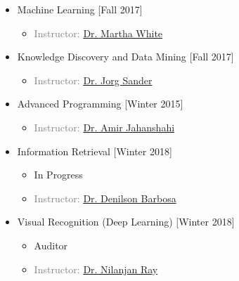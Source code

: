 \begin{multicols}{2}
\begin{itemize}
	\item {} Machine Learning \hfill[Fall 2017]
	\begin{itemize}
		\item \textcolor{gray}{Instructor: \href{http://webdocs.cs.ualberta.ca/~whitem/}{Dr. Martha White}}
	\end{itemize}


	\item {} Knowledge Discovery and Data Mining \hfill[Fall 2017]
	\begin{itemize}
		\item \textcolor{gray}{Instructor: \href{http://webdocs.cs.ualberta.ca/~joerg/}{Dr. Jorg Sander}}
	\end{itemize}
	
	\item {} Advanced Programming \hfill \hfill[Winter 2015]
	\begin{itemize}
		\item \textcolor{gray}{Instructor: \href{http://ee.aut.ac.ir/autcms/people/verticalPagesAjax/professorHomePage.htm?url=jahanshahi&depurl=electrical-engineering&lang=en&cid=50451496}{Dr. Amir Jahanshahi}}
		
	\end{itemize}

	\item {} Information Retrieval \hfill[Winter 2018]
	\begin{itemize}
		\item In Progress 
		\item \textcolor{gray}{Instructor: \href{https://sites.ualberta.ca/~denilson/}{Dr. Denilson Barbosa}}
	\end{itemize}

	\item {} Visual Recognition  (Deep Learning) \hfill[Winter 2018]
	\begin{itemize}
		\item Auditor 
		\item \textcolor{gray}{Instructor: \href{https://webdocs.cs.ualberta.ca/~nray1/}{Dr. Nilanjan Ray}}
	\end{itemize}
	
\end{itemize}
\end{multicols}



